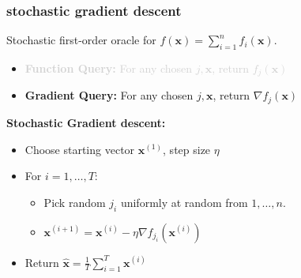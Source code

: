 \documentclass[compress]{beamer}
\newcommand{\bv}[1]{\mathbf{#1}}
\begin{document}
\begin{frame}[t]
	\frametitle{stochastic gradient descent}
   {Stochastic first-order oracle} for $f(\bv{x}) = \sum_{i=1}^n f_i(\bv{x})$. 
	\begin{itemize}
		\item \textcolor{lightgray}{ \textbf{Function Query:} For any chosen $j, \bv{x}$, return $f_j(\bv{x})$}
		\item \textbf{Gradient Query:} For any chosen $j, \bv{x}$, return $\nabla f_j(\bv{x})$
	\end{itemize}

	\textbf{Stochastic Gradient descent:}
	\begin{itemize}
		\item Choose starting vector $\bv{x}^{(1)}$, step size $\eta$
		\item For $i = 1,\ldots, T$:
		\begin{itemize}
			\item Pick random $j_i$ uniformly at random from $1, \ldots, n$.
			\item $\bv{x}^{(i+1)} = \bv{x}^{(i)} - \eta \nabla f_{j_i}(\bv{x}^{(i)})$
		\end{itemize}
		\item Return $\hat{\bv{x}} = \frac{1}{T}\sum_{i=1}^T \bv{x}^{(i)}$
	\end{itemize}
\end{frame}
\end{document}
